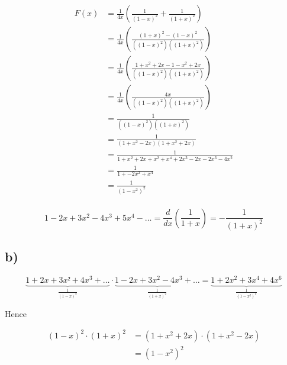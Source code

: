 \documentclass[a4paper,11pt]{report}
\begin{document}
\begin{align*}
  F(x) &= \frac{1}{4x}( \frac{1}{(1-x)^2} + \frac{1}{(1+x)^2}) \\
       &= \frac{1}{4x}(\frac{(1+x)^2 - (1-x)^2}{((1-x)^2)((1+x)^2)}) \\
       &= \frac{1}{4x}(\frac{1 + x^2 + 2x - 1 - x^2 + 2x}{((1-x)^2)((1+x)^2)})\\
       &= \frac{1}{4x}(\frac{4x}{((1-x)^2)((1+x)^2)})\\
       &= \frac{1}{((1-x)^2)((1+x)^2)}\\
       &= \frac{1}{(1 + x^2 - 2x)(1 + x^2 + 2x)}\\
       &= \frac{1}{1 + x^2 + 2x + x^2 + x^4 + 2x^3 -2x -2x^3 - 4x^2}\\
       &= \frac{1}{1 + -2x^2 + x^4}\\
       &= \frac{1}{(1-x^2)^2}\\
\end{align*}

\[
  1 - 2x + 3x^2 - 4x^3 + 5x^4 - \dots = \frac{d}{dx} (\frac{1}{1+x}) = -\frac{1}{(1+x)^2}
\]

\subsection*{b)}

\[
  \underbrace{1 + 2x + 3x² + 4x^3 + \dots}_{\frac{1}{(1-x)^2}} \cdot
  \underbrace{1 - 2x + 3x^2 -4x^3 + \dots}_{\frac{1}{(1+x)^2}} =
  \underbrace{1 + 2x^2 + 3x^4 + 4x^6}_{\frac{1}{(1-x^2)^2}}
\]

Hence

\begin{align*}
  (1-x)^2 \cdot (1+x)^2 &= (1 + x^2 + 2x) \cdot (1 + x^2 - 2x) \\
                        &= (1-x^2)^2
\end{align*}
\end{document}
